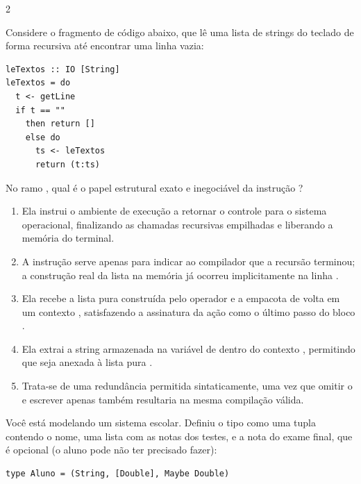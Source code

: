 \documentclass[a4paper,10pt,brazil]{article}
\begin{document}
\begin{multicols}{2}
\begin{enumerate}
\end{enumerate}

Considere o fragmento de código abaixo, que lê uma lista de strings do teclado de forma recursiva até encontrar uma linha vazia:

\begin{verbatim}
leTextos :: IO [String]
leTextos = do
  t <- getLine
  if t == "" 
    then return []
    else do
      ts <- leTextos
      return (t:ts)
\end{verbatim}

No ramo , qual é o papel estrutural exato e inegociável da instrução ?

\begin{enumerate}
  \item Ela instrui o ambiente de execução a retornar o controle para o sistema operacional, finalizando as chamadas recursivas empilhadas e liberando a memória do terminal.

  \item A instrução  serve apenas para indicar ao compilador que a recursão terminou; a construção real da lista na memória já ocorreu implicitamente na linha .

  \item Ela recebe a lista pura construída pelo operador \haskellinline{(:)} e a empacota de volta em um contexto , satisfazendo a assinatura da ação como o último passo do bloco .

  \item Ela extrai a string armazenada na variável  de dentro do contexto , permitindo que seja anexada à lista pura .

  \item Trata-se de uma redundância permitida sintaticamente, uma vez que omitir o  e escrever apenas  também resultaria na mesma compilação válida.


\end{enumerate}

Você está modelando um sistema escolar. Definiu o tipo  como uma tupla contendo o nome, uma lista com as notas dos testes, e a nota do exame final, que é opcional (o aluno pode não ter precisado fazer):
\begin{verbatim}
type Aluno = (String, [Double], Maybe Double)
\end{verbatim}


\end{multicols}
\end{document}
